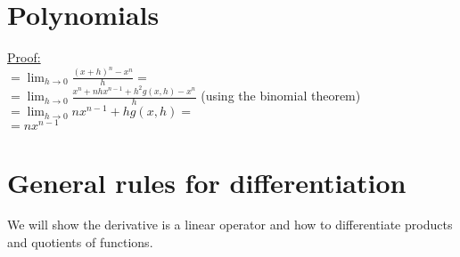\documentclass{book}
\newtheorem{theorem}{Theorem}[section]
\begin{document}
\section{Polynomials}
\begin{tcolorbox}[width=\textwidth,colback={mygray},title={\begin{theorem} Let $n \geq 1$ be any integer. Then  $f(x) = x^n$ , then $f'(x) = n x^{n-1}$ \end{theorem}},colbacktitle=myblue,coltitle=black] 
\underline{Proof:}\\
$=\lim_{h \to 0 }\displaystyle\frac{(x+h)^n- x^n}{h} =$\\
$=\lim_{h \to 0 }\displaystyle\frac{x^n + nhx^{n-1} + h^2 g(x,h) - x^n}{h}$ (using the binomial theorem)\\
$=\lim_{h \to 0 } nx^{n-1} + h g(x,h) =$ \\
$= \displaystyle n x^{n-1}$


\end{tcolorbox}

\section{General rules for differentiation}
We will show the derivative is a linear operator and how to differentiate products and quotients of functions.
\end{document}

